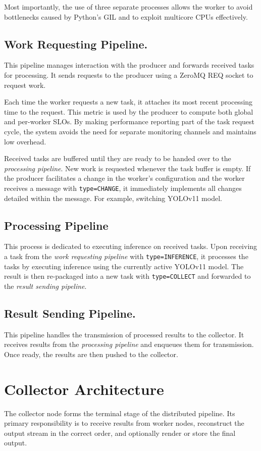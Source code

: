 Most importantly, the use of three separate processes allows the worker to avoid bottlenecks caused by Python’s GIL and to exploit multicore CPUs effectively.

\subsection{Work Requesting Pipeline.}
This pipeline manages interaction with the producer and forwards received tasks for processing. It sends requests to the producer using a ZeroMQ REQ socket to request work. 

Each time the worker requests a new task, it attaches its most recent processing time to the request. This metric is used by the producer to compute both global and per-worker SLOs. By making performance reporting part of the task request cycle, the system avoids the need for separate monitoring channels and maintains low overhead.

Received tasks are buffered until they are ready to be handed over to the \textit{processing pipeline}. New work is requested whenever the task buffer is empty. If the producer facilitates a change in the worker's configuration and the worker receives a message with \texttt{type=CHANGE}, it immediately implements all changes detailed within the message. For example, switching YOLOv11 model.

\subsection{Processing Pipeline}
This process is dedicated to executing inference on received tasks. Upon receiving a task from the \textit{work requesting pipeline} with \texttt{type=INFERENCE}, it processes the tasks by executing inference using the currently active YOLOv11 model. The result is then re-packaged into a new task with \texttt{type=COLLECT} and forwarded to the \textit{result sending pipeline}.

\subsection{Result Sending Pipeline.}
This pipeline handles the transmission of processed results to the collector. It receives results from the \textit{processing pipeline} and enqueues them for transmission. Once ready, the results are then pushed to the collector.

\section{Collector Architecture}
The collector node forms the terminal stage of the distributed pipeline. Its primary responsibility is to receive results from worker nodes, reconstruct the output stream in the correct order, and optionally render or store the final output. 

